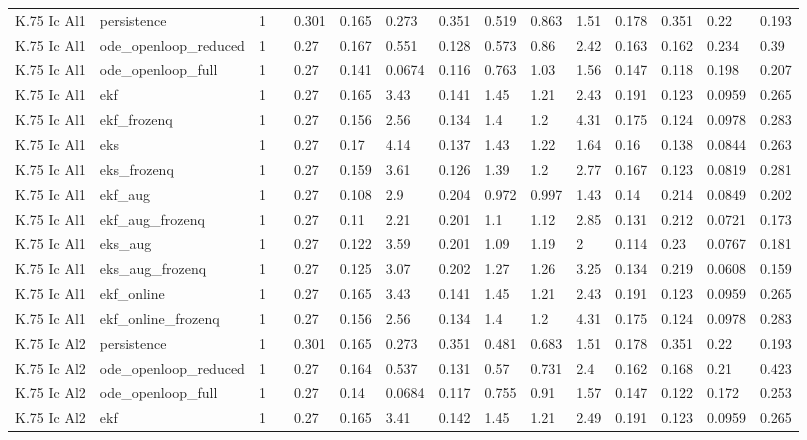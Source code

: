 \begin{table}[t]
\begin{tabular}{lllllllllllllll}
K.75 Ic Al1 & persistence & 1 &  & 0.301 & 0.165 & 0.273 & 0.351 & 0.519 & 0.863 & 1.51 & 0.178 & 0.351 & 0.22 & 0.193 \\
K.75 Ic Al1 & ode\_openloop\_reduced & 1 &  & 0.27 & 0.167 & 0.551 & 0.128 & 0.573 & 0.86 & 2.42 & 0.163 & 0.162 & 0.234 & 0.39 \\
K.75 Ic Al1 & ode\_openloop\_full & 1 &  & 0.27 & 0.141 & 0.0674 & 0.116 & 0.763 & 1.03 & 1.56 & 0.147 & 0.118 & 0.198 & 0.207 \\
K.75 Ic Al1 & ekf & 1 &  & 0.27 & 0.165 & 3.43 & 0.141 & 1.45 & 1.21 & 2.43 & 0.191 & 0.123 & 0.0959 & 0.265 \\
K.75 Ic Al1 & ekf\_frozenq & 1 &  & 0.27 & 0.156 & 2.56 & 0.134 & 1.4 & 1.2 & 4.31 & 0.175 & 0.124 & 0.0978 & 0.283 \\
K.75 Ic Al1 & eks & 1 &  & 0.27 & 0.17 & 4.14 & 0.137 & 1.43 & 1.22 & 1.64 & 0.16 & 0.138 & 0.0844 & 0.263 \\
K.75 Ic Al1 & eks\_frozenq & 1 &  & 0.27 & 0.159 & 3.61 & 0.126 & 1.39 & 1.2 & 2.77 & 0.167 & 0.123 & 0.0819 & 0.281 \\
K.75 Ic Al1 & ekf\_aug & 1 &  & 0.27 & 0.108 & 2.9 & 0.204 & 0.972 & 0.997 & 1.43 & 0.14 & 0.214 & 0.0849 & 0.202 \\
K.75 Ic Al1 & ekf\_aug\_frozenq & 1 &  & 0.27 & 0.11 & 2.21 & 0.201 & 1.1 & 1.12 & 2.85 & 0.131 & 0.212 & 0.0721 & 0.173 \\
K.75 Ic Al1 & eks\_aug & 1 &  & 0.27 & 0.122 & 3.59 & 0.201 & 1.09 & 1.19 & 2 & 0.114 & 0.23 & 0.0767 & 0.181 \\
K.75 Ic Al1 & eks\_aug\_frozenq & 1 &  & 0.27 & 0.125 & 3.07 & 0.202 & 1.27 & 1.26 & 3.25 & 0.134 & 0.219 & 0.0608 & 0.159 \\
K.75 Ic Al1 & ekf\_online & 1 &  & 0.27 & 0.165 & 3.43 & 0.141 & 1.45 & 1.21 & 2.43 & 0.191 & 0.123 & 0.0959 & 0.265 \\
K.75 Ic Al1 & ekf\_online\_frozenq & 1 &  & 0.27 & 0.156 & 2.56 & 0.134 & 1.4 & 1.2 & 4.31 & 0.175 & 0.124 & 0.0978 & 0.283 \\
K.75 Ic Al2 & persistence & 1 &  & 0.301 & 0.165 & 0.273 & 0.351 & 0.481 & 0.683 & 1.51 & 0.178 & 0.351 & 0.22 & 0.193 \\
K.75 Ic Al2 & ode\_openloop\_reduced & 1 &  & 0.27 & 0.164 & 0.537 & 0.131 & 0.57 & 0.731 & 2.4 & 0.162 & 0.168 & 0.21 & 0.423 \\
K.75 Ic Al2 & ode\_openloop\_full & 1 &  & 0.27 & 0.14 & 0.0684 & 0.117 & 0.755 & 0.91 & 1.57 & 0.147 & 0.122 & 0.172 & 0.253 \\
K.75 Ic Al2 & ekf & 1 &  & 0.27 & 0.165 & 3.41 & 0.142 & 1.45 & 1.21 & 2.49 & 0.191 & 0.123 & 0.0959 & 0.265 \\

\end{tabular}
\end{table}

